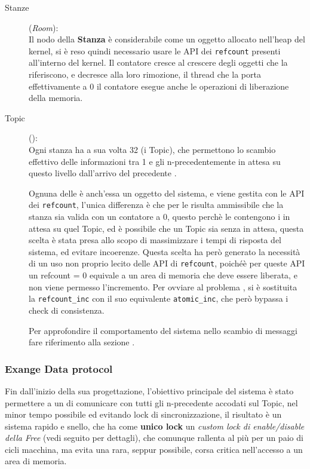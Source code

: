 \begin{description}
\item[Stanze] (\textit{Room}):\\
        Il nodo della \textbf{Stanza} è considerabile come un oggetto allocato nell'heap del kernel, si è reso
        quindi necessario usare le API dei \texttt{refcount} presenti all'interno del kernel. Il contatore cresce al
        crescere degli oggetti che la riferiscono, e decresce alla loro rimozione, il thread che la porta
        effettivamente a 0 il contatore esegue anche le operazioni di liberazione della memoria.

\item[Topic] (\exangeRoom):\\
    Ogni stanza ha a sua volta 32 \exangeRoom (i Topic), che permettono lo scambio effettivo delle informazioni
    tra 1 \Writer e gli n-\Reader precedentemente in attesa su questo livello dall'arrivo del precedente \Writer.

    Ognuna delle \exangeRoom è anch'essa un oggetto del sistema, e viene gestita con le API dei \texttt{refcount},
    l'unica differenza è che per le \exangeRoom risulta ammissibile che la stanza sia valida con un contatore a 0,
    questo perchè le \exangeRoom contengono i \Reader in attesa su quel Topic, ed è possibile che un Topic sia
    senza \Reader in attesa, questa scelta è stata presa allo scopo di massimizzare i tempi di risposta del sistema,
    ed evitare incoerenze.
    Questa scelta ha però generato la necessità di un uso non proprio lecito delle API di \texttt{refcount},
    poichéè per queste API un refcount = 0 equivale a un area di memoria che deve essere liberata, e non viene permesso
    l'incremento. Per ovviare al problema , si è sostituita la \verb|refcount_inc| con il suo equivalente
    \verb|atomic_inc|, che però bypassa i check di consistenza.

    Per approfondire il comportamento del sistema nello scambio di messaggi fare riferimento alla sezione
    .


\end{description}

\newpage

\subsubsection{Exange Data protocol} \label{exangeDataProtocol}

Fin dall'inizio della sua progettazione, l'obiettivo principale del sistema è stato permettere a un \Writer di
comunicare con tutti gli n-\Reader precedente accodati sul Topic, nel minor tempo possibile ed evitando lock
di sincronizzazione, il risultato è un sistema rapido e snello, che ha come \textbf{unico lock} un \textit{custom lock
di
enable/disable della Free} (vedi seguito per dettagli), che comunque rallenta al più per un paio di cicli macchina, ma
evita una rara, seppur possibile, corsa critica nell'accesso a un area di memoria.

